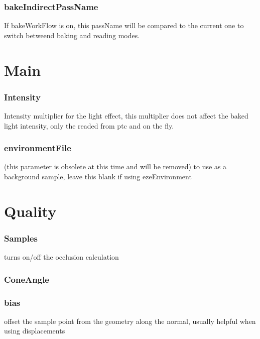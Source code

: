\documentclass[final,letterpaper,twoside,12pt]{report}
\begin{document}
\subsubsection {bakeIndirectPassName}
If bakeWorkFlow is on, this passName will be compared to the current one to switch betweend baking and reading modes.
\smallskip


\section {Main}
\subsubsection {Intensity}
Intensity multiplier for the light effect, this multiplier does not affect the baked light intensity, only the readed from ptc and on the fly.
\smallskip
\subsubsection {environmentFile}
(this parameter is obsolete at this time and will be removed) to use as a background sample, leave this blank if using ezeEnvironment
\smallskip


\section {Quality}
\subsubsection {Samples}
turns on/off the occlusion calculation
\smallskip
\subsubsection {ConeAngle}

\smallskip
\subsubsection {bias}
offset the sample point from the geometry along the normal, usually helpful when using displacements
\smallskip
\end{document}
